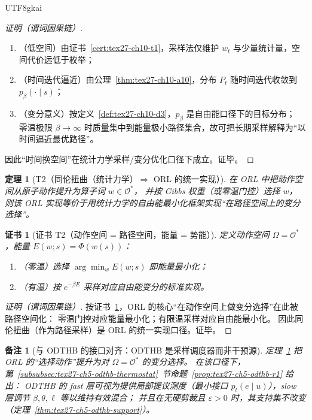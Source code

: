 \documentclass[12pt]{article}
\newtheorem{theorem}{定理}[section]
\newtheorem{remark}{备注}[section]
\newtheorem{Certificate}{证书}[section]
\begin{document}
\begin{CJK*}{UTF8}{gkai}
\begin{proof}[证明（谓词因果链）]
\begin{enumerate}
  \item（低空间）由证书~\ref{cert:tex27-ch10-t1}，采样法仅维护 $w_t$ 与少量统计量，空间代价远低于枚举；
  \item（时间迭代逼近）由公理~\ref{thm:tex27-ch10-a10}，分布 $P_t$ 随时间迭代收敛到 $p_\beta(\cdot\mid s)$；
  \item（变分意义）按定义~\ref{def:tex27-ch10-d3}，$p_\beta$ 是自由能口径下的目标分布；
  零温极限 $\beta\to\infty$ 时质量集中到能量极小路径集合，故可把长期采样解释为“以时间逼近最优路径”。
\end{enumerate}
因此“时间换空间”在统计力学采样/变分优化口径下成立。证毕。
\end{proof}

\begin{theorem}[T2（同伦扭曲（统计力学）$\Rightarrow$ ORL 的统一实现）]
\label{thm:tex27-ch10-t2}
在 ORL 中把动作空间从原子动作提升为算子词 $w\in\mathcal{O}^*$，
并按 Gibbs 权重（或零温门控）选择 $w$，
则该 ORL 实现等价于用统计力学的自由能最小化框架实现“在路径空间上的变分选择”。
\end{theorem}

\begin{Certificate}[证书 T2（动作空间 = 路径空间，能量 = 势能）]
\label{cert:tex27-ch10-t2}
定义动作空间 $\Omega=\mathcal{O}^*$，能量 $E(w;s)=\Phi(w(s))$：
\begin{enumerate}
  \item（零温）选择 $\arg\min_w E(w;s)$ 即能量最小化；
  \item（有温）按 $e^{-\beta E}$ 采样对应自由能变分的标准实现。
\end{enumerate}
\end{Certificate}

\begin{proof}[证明（谓词因果链）]
按证书~\ref{cert:tex27-ch10-t2}，ORL 的核心“在动作空间上做变分选择”在此被路径空间化：
零温门控对应能量最小化；有限温采样对应自由能最小化。
因此同伦扭曲（作为路径采样）是 ORL 的统一实现口径。证毕。
\end{proof}

\begin{remark}[与 ODTHB 的接口对齐：ODTHB 是采样调度器而非干预源]
定理~\ref{thm:tex27-ch10-t2} 把 ORL 的“选择动作”提升为对 $\Omega=\mathcal{O}^*$ 的变分选择。
在该口径下，第~\ref{subsubsec:tex27-ch5-odthb-thermostat}~节命题~\ref{prop:tex27-ch5-odthb-r1} 给出：
ODTHB 的 fast 层可视为提供局部提议测度（最小接口 $p_t(e\mid u)$），slow 层调节 $\beta,\theta,\ell$ 等以维持有效混合；
并且在无硬剪裁且 $\varepsilon>0$ 时，其支持集不改变（定理~\ref{thm:tex27-ch5-odthb-support}）。
\end{remark}


\end{CJK*}
\end{document}
